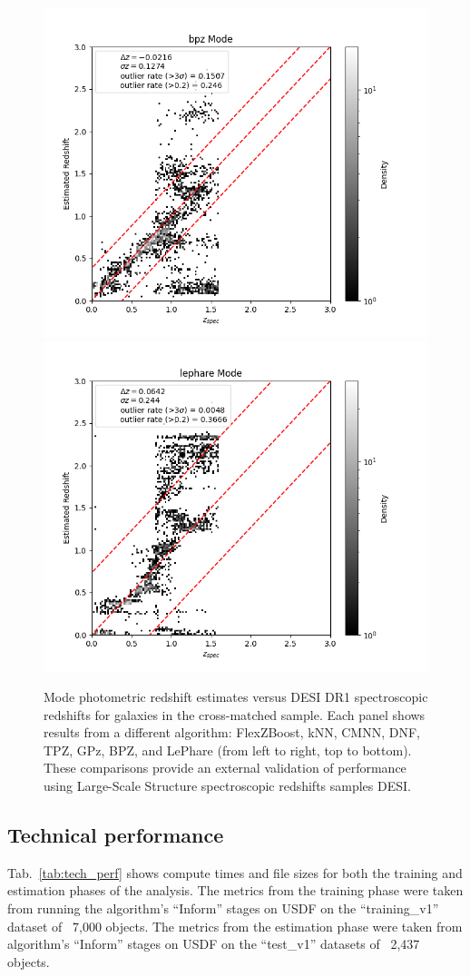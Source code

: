 \begin{figure}
\includegraphics[width=0.32\linewidth]{figures/bpz_mode_desi.png}
\includegraphics[width=0.32\linewidth]{figures/lephare_mode_desi.png}
\caption{Mode photometric redshift estimates versus DESI DR1 spectroscopic redshifts for galaxies in the  cross-matched sample. Each panel shows results from a different \photoz algorithm: FlexZBoost, kNN, CMNN, DNF, TPZ, GPz, BPZ, and LePhare (from left to right, top to bottom). These comparisons provide an external validation of \photoz performance using Large-Scale Structure spectroscopic redshifts samples DESI.}
\label{fig:sv_validation}
\end{figure}



\subsection{Technical performance}
\label{sec:performance:technical}

Tab.~\ref{tab:tech_perf} shows compute times and file sizes for both the training and estimation phases of the analysis.    The metrics from the training phase were taken from running the algorithm's ``Inform'' stages on USDF on the ``training\_v1'' dataset of ~7,000 objects.    The metrics from the estimation phase were taken from algorithm's ``Inform'' stages on USDF on the ``test\_v1'' datasets of ~2,437 objects.

